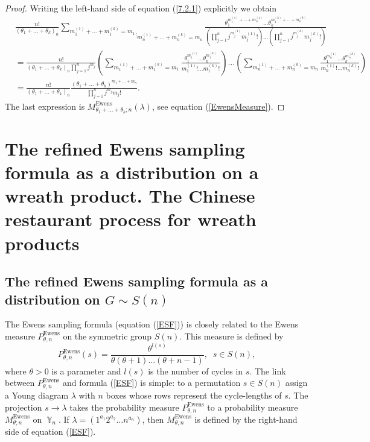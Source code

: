 \documentclass[12pt]{amsart}
\theoremstyle{definition}
\numberwithin{equation}{section}
\DeclareMathOperator{\Y}{\mathbb{Y}}
\DeclareMathOperator{\Ewens}{Ewens}
\begin{document}
\begin{proof} Writing the left-hand side of equation (\ref{7.2.1})
explicitly we obtain
\begin{equation}
\begin{split}
&\frac{n!}{\left(\theta_1+\ldots+\theta_k\right)_n}
\underset{m_n^{(1)}+\ldots+m_n^{(k)}=m_n}{\underset{\vdots}{\sum\limits_{m_1^{(1)}+\ldots+m_1^{(k)}=m_1}}}
\frac{\theta_1^{m_1^{(1)}+\ldots+m_n^{(1)}}\ldots
\theta_k^{m_1^{(k)}+\ldots+m_n^{(k)}}}{\left(\prod\limits_{j=1}^n
j^{m_j^{(1)}}m_j^{(1)}!\right)\ldots
\left(\prod\limits_{j=1}^n
j^{m_j^{(k)}}m_j^{(k)}!\right)}\\
&=\frac{n!}{\left(\theta_1+\ldots+\theta_k\right)_n\prod\limits_{j=1}^nj^{m_j}}
\left(\sum\limits_{m_1^{(1)}+\ldots+m_1^{(k)}=m_1}
\frac{\theta_1^{m_1^{(1)}}\ldots\theta_k^{m_1^{(k)}} }{m_1^{(1)}!\ldots m_1^{(k)}!}\right)
\ldots
\left(\sum\limits_{m_n^{(1)}+\ldots+m_n^{(k)}=m_n}
\frac{\theta_1^{m_n^{(1)}}\ldots\theta_k^{m_n^{(k)}} }{m_n^{(1)}!\ldots m_n^{(k)}!}\right)\\
&=\frac{n!}{\left(\theta_1+\ldots+\theta_k\right)_n}
\frac{\left(\theta_1+\ldots+\theta_k\right)^{m_1+\ldots+m_n}}{\prod\limits_{j=1}^nj^{m_j}m_j!}.
\end{split}
\nonumber
\end{equation}
The last expression is $M_{\theta_1+\ldots+\theta_k; n}^{\Ewens}\left(\lambda\right)$, see equation (\ref{EwensMeasure}).
\end{proof}


\section{The refined Ewens sampling formula as a distribution on a wreath product. The Chinese restaurant process for wreath products}\label{SectionChineseMain}
\subsection{The refined Ewens sampling formula as a distribution on $G\sim S(n)$}\label{SectionChinese}
The Ewens sampling formula (equation (\ref{ESF})) is closely related to the Ewens measure $P_{\theta,n}^{\Ewens}$ on the symmetric group $S(n)$. This measure is defined by
$$
P_{\theta,n}^{\Ewens}(s)=\frac{\theta^{l(s)}}{\theta(\theta+1)\ldots (\theta+n-1)},\;\; s\in S(n),
$$
where $\theta>0$ is a parameter and $l(s)$ is the number of cycles in $s$. The link between $P_{\theta,n}^{\Ewens}$ and formula (\ref{ESF}) is simple:
to a permutation $s\in S(n)$ assign a Young diagram $\lambda$ with $n$ boxes whose rows represent the cycle-lengths of $s$. The projection $s\rightarrow\lambda$ takes the probability measure $P_{\theta,n}^{\Ewens}$ to a probability measure $M_{\theta;n}^{\Ewens}$ on $\Y_n$.  If $\lambda=\left(1^{a_1}2^{a_2}\ldots n^{a_n}\right)$, then
$M_{\theta,n}^{\Ewens}$ is defined by the right-hand side of equation (\ref{ESF}).
\end{document}
